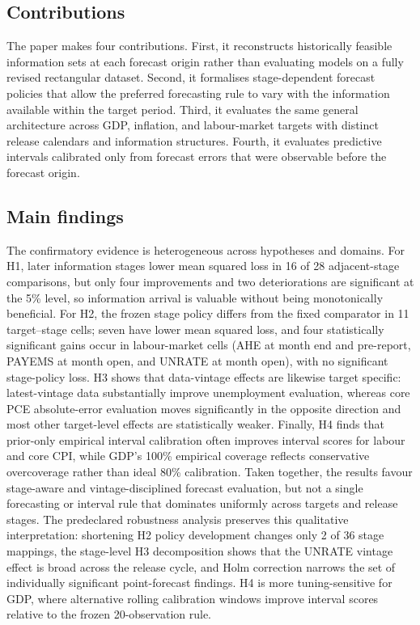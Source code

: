 \subsection{Contributions}
\label{subsec:contributions}

The paper makes four contributions. First, it reconstructs historically feasible information sets at each forecast origin rather than evaluating models on a fully revised rectangular dataset. Second, it formalises stage-dependent forecast policies that allow the preferred forecasting rule to vary with the information available within the target period. Third, it evaluates the same general architecture across GDP, inflation, and labour-market targets with distinct release calendars and information structures. Fourth, it evaluates predictive intervals calibrated only from forecast errors that were observable before the forecast origin.

\subsection{Main findings}
\label{subsec:main_findings}

The confirmatory evidence is heterogeneous across hypotheses and domains.
For H1, later information stages lower mean squared loss in 16 of 28
adjacent-stage comparisons, but only four improvements and two deteriorations
are significant at the 5\% level, so information arrival is valuable without
being monotonically beneficial.  For H2, the frozen stage policy differs from
the fixed comparator in 11 target--stage cells; seven have lower mean squared
loss, and four statistically significant gains occur in labour-market cells
(AHE at month end and pre-report, PAYEMS at month open, and UNRATE at month
open), with no significant stage-policy loss.  H3 shows that data-vintage
effects are likewise target specific: latest-vintage data substantially
improve unemployment evaluation, whereas core PCE absolute-error evaluation
moves significantly in the opposite direction and most other target-level
effects are statistically weaker.  Finally, H4 finds that prior-only empirical
interval calibration often improves interval scores for labour and core CPI,
while GDP's 100\% empirical coverage reflects conservative overcoverage rather
than ideal 80\% calibration.  Taken together, the results favour
stage-aware and vintage-disciplined forecast evaluation, but not a single
forecasting or interval rule that dominates uniformly across targets and
release stages. The predeclared robustness analysis preserves this qualitative
interpretation: shortening H2 policy development changes only 2 of 36 stage
mappings, the stage-level H3 decomposition shows that the UNRATE vintage effect
is broad across the release cycle, and Holm correction narrows the set of
individually significant point-forecast findings. H4 is more tuning-sensitive
for GDP, where alternative rolling calibration windows improve interval scores
relative to the frozen 20-observation rule.

